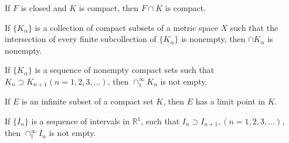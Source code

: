 

\begin{myCorollary}
    If $F$ is closed and $K$ is compact, then $F \cap K$ is compact.
\end{myCorollary}



\begin{thm}
    \label{thm:2.36}
    If $\{K_\alpha\}$ is a collection of compact subsets of a metric space $X$ such that the intersection of every finite subcollection of $\{K_\alpha\}$ is nonempty, then $\cap K_\alpha$ is nonempty.    
\end{thm}


\begin{myCorollary}
    If $\{K_\alpha\}$ is a sequence of nonempty compact sets such that $K_n \supset K_{n+1} (n=1,2,3,...)$, then $\cap_1^\infty K_n$ is not empty.
\end{myCorollary}

\begin{thm}
    \label{thm:2.37}
    If $E$ is an infinite subset of a compact set $K$, then $E$ has a limit point in $K$.
\end{thm}

\begin{thm}
    \label{thm:2.38}
    If $\{I_n\}$ is a sequence of intervals in $\mathbb{R}^1$, such that $I_n \supset I_{n+1}, (n=1,2,3,...)$, then $\cap_1^\infty I_n$ is not empty.
\end{thm}

